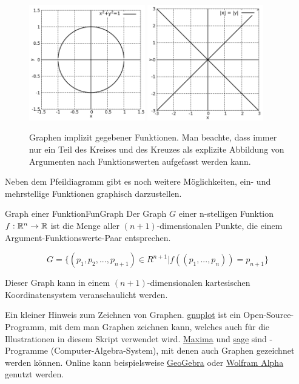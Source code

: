 \begin{figure}
    \centering
    \includegraphics[width=0.45\textwidth]{./gnuplot/implicit-fun-circle}
    \includegraphics[width=0.45\textwidth]{./gnuplot/implicit-fun-cross}
    \caption{Graphen implizit gegebener Funktionen. Man beachte, dass immer nur ein Teil des Kreises und des Kreuzes als explizite Abbildung von Argumenten nach Funktionswerten aufgefasst werden kann.}
    \label{fig:ImplFun}
\end{figure}

Neben dem Pfeildiagramm gibt es noch weitere Möglichkeiten, ein- und mehrstellige Funktionen graphisch darzustellen.

\begin{definition}{Graph einer Funktion}{FunGraph}
    Der Graph $G$ einer n-stelligen Funktion $f: \mathbb{R}^n \to \mathbb{R}$ ist die Menge aller $(n+1)$-dimensionalen Punkte, die einem Argument-Funktionswerte-Paar entsprechen.

    $$
    G = \lbrace (p_1, p_2, ..., p_{n+1}) \in R^{n+1} | f((p_1, ..., p_n)) = p_{n+1} \rbrace
    $$

    Dieser Graph kann in einem $(n+1)$-dimensionalen kartesischen Koordinatensystem veranschaulicht werden.
\end{definition}

Ein kleiner Hinweis zum Zeichnen von Graphen. \href{http://www.gnuplot.info/}{gnuplot} ist ein Open-Source-Programm, mit dem man Graphen zeichnen kann, welches auch für die Illustrationen in diesem Skript verwendet wird. \href{http://maxima.sourceforge.net/}{Maxima} und \href{https://www.sagemath.org/}{sage} sind -Programme (Computer-Algebra-System), mit denen auch Graphen gezeichnet werden können. Online kann beispielsweise \href{https://www.geogebra.org/graphing}{GeoGebra} oder \href{https://www.wolframalpha.com/examples/mathematics/plotting-and-graphics/}{Wolfram Alpha} genutzt werden.

